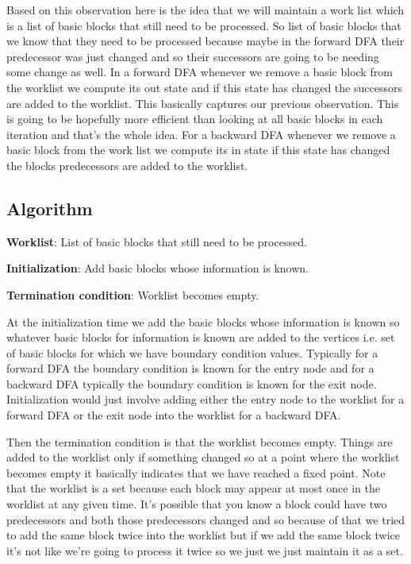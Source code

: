 Based on this observation here is the idea that we will maintain a work list which is a list of basic blocks that still need to be processed. So list of basic blocks that we know that they need to be processed because maybe in the forward DFA their predecessor was just changed and so their successors are going to be needing some change as
well. In a forward DFA whenever we remove a basic block from the worklist we compute its out state and if this state has changed the successors are added to the worklist. This basically captures our previous observation. This is going to be hopefully more efficient
than looking at all basic blocks in each iteration and that's the whole idea. For a backward DFA whenever we remove a basic block from the work list we compute its in state if this state has changed the blocks predecessors are added to the worklist.

\subsection{Algorithm}
\textbf{Worklist}: List of basic blocks that still need to be processed.

\textbf{Initialization}: Add basic blocks whose information is known.

\textbf{Termination condition}: Worklist becomes empty.

At the initialization time we add the basic blocks whose information is known so whatever
basic blocks for information is known are added to the vertices i.e. set of basic blocks for which we have boundary condition values. Typically for a forward DFA the boundary condition is known for the entry node and for a backward DFA typically the boundary condition is known for the exit node. Initialization would just involve adding either the entry node to the worklist for a forward DFA or the exit node into the worklist for a backward DFA. 

Then the termination condition is that the worklist becomes empty. Things are added to the worklist only if something changed so at a point where the worklist becomes empty it basically indicates that we have reached a fixed point. Note that the worklist is a set 
because each block may appear at most once in the worklist at any given time. It's possible that you know a block could have two predecessors and both those predecessors changed and so because of that we tried to add the same block twice into the worklist but if we add the same block twice it's not like we're going to process it twice so we just we just maintain it as a set.







